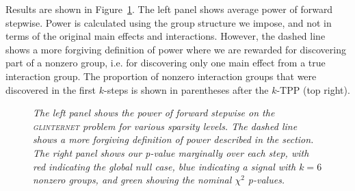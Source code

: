 \documentclass{imsart}
\begin{document}
Results are shown in Figure~\ref{fig:glint}. The left
panel shows average power of forward stepwise. Power is calculated
using the group structure we impose, and not in terms of the original
main effects and interactions. However, the dashed line shows a more
forgiving definition of power where we are rewarded for discovering part
of a nonzero group, i.e. for discovering only one main effect from a
true interaction group. The proportion of nonzero interaction groups
that were discovered in the first $k$-steps is shown in parentheses
after the $k$-TPP (top right).

\begin{figure}
\begin{center}
\hspace{-15pt}
\caption{\small \it The left panel shows the power of forward stepwise
on the \textsc{glinternet} problem
for various sparsity levels. The dashed line shows a more forgiving
definition of power described in the section.
The right panel shows our p-value marginally
over each step, with red indicating the global null case, blue
indicating a signal with $k=6$ nonzero groups, and green showing
the nominal $\chi^2$ p-values.}
\label{fig:glint}
\end{center}
\end{figure}
\end{document}

